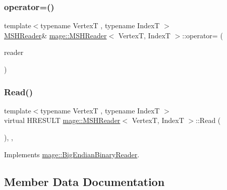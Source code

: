 \hypertarget{classmage_1_1_m_s_h_reader_a0f014d780eaa5477aa7206db51fede2f}{}\label{classmage_1_1_m_s_h_reader_a0f014d780eaa5477aa7206db51fede2f} 
\subsubsection{\texorpdfstring{operator=()}{operator=()}\hspace{0.1cm}{\footnotesize\ttfamily [2/2]}}
{\footnotesize\ttfamily template$<$typename VertexT , typename IndexT $>$ \\
\hyperlink{classmage_1_1_m_s_h_reader}{M\+S\+H\+Reader}\& \hyperlink{classmage_1_1_m_s_h_reader}{mage\+::\+M\+S\+H\+Reader}$<$ VertexT, IndexT $>$\+::operator= (\begin{DoxyParamCaption}\item[{\hyperlink{classmage_1_1_m_s_h_reader}{M\+S\+H\+Reader}$<$ VertexT, IndexT $>$ \&\&}]{reader }\end{DoxyParamCaption})\hspace{0.3cm}{\ttfamily [delete]}}

\hypertarget{classmage_1_1_m_s_h_reader_abbecacfb2b0d4ec343c79a655c4a7cbe}{}\label{classmage_1_1_m_s_h_reader_abbecacfb2b0d4ec343c79a655c4a7cbe} 
\subsubsection{\texorpdfstring{Read()}{Read()}}
{\footnotesize\ttfamily template$<$typename VertexT , typename IndexT $>$ \\
virtual H\+R\+E\+S\+U\+LT \hyperlink{classmage_1_1_m_s_h_reader}{mage\+::\+M\+S\+H\+Reader}$<$ VertexT, IndexT $>$\+::Read (\begin{DoxyParamCaption}{ }\end{DoxyParamCaption})\hspace{0.3cm}{\ttfamily [override]}, {\ttfamily [private]}, {\ttfamily [virtual]}}



Implements \hyperlink{classmage_1_1_big_endian_binary_reader_a723f28280c4e1343f42f41eea2b97015}{mage\+::\+Big\+Endian\+Binary\+Reader}.



\subsection{Member Data Documentation}
\hypertarget{classmage_1_1_m_s_h_reader_ae96b703b052eb9951872683e17ab11ae}{}\label{classmage_1_1_m_s_h_reader_ae96b703b052eb9951872683e17ab11ae} 
